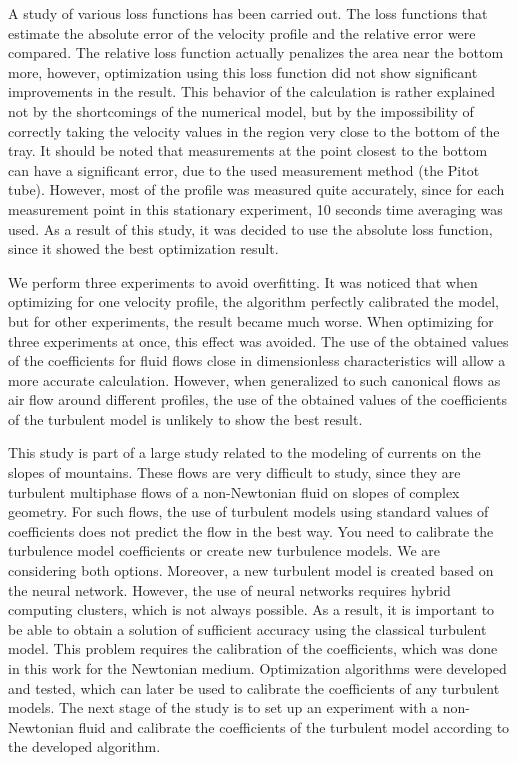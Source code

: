 \documentclass[mathematics,article,submit,pdftex,moreauthors]{Definitions/mdpi}
\begin{document}
A study of various loss functions has been carried out. The loss functions that estimate the absolute error of the velocity profile and the relative error were compared. The relative loss function actually penalizes the area near the bottom more, however, optimization using this loss function did not show significant improvements in the result. This behavior of the calculation is rather explained not by the shortcomings of the numerical model, but by the impossibility of correctly taking the velocity values in the region very close to the bottom of the tray. It should be noted that measurements at the point closest to the bottom can have a significant error, due to the used measurement method (the Pitot tube). However, most of the profile was measured quite accurately, since for each measurement point in this stationary experiment, 10 seconds time averaging was used. As a result of this study, it was decided to use the absolute loss function, since it showed the best optimization result.

We perform three experiments to avoid overfitting. It was noticed that when optimizing for one velocity profile, the algorithm perfectly calibrated the model, but for other experiments, the result became much worse. When optimizing for three experiments at once, this effect was avoided. The use of the obtained values of the coefficients for fluid flows close in dimensionless characteristics will allow a more accurate calculation. However, when generalized to such canonical flows as air flow around different profiles, the use of the obtained values of the coefficients of the turbulent model is unlikely to show the best result.

This study is part of a large study related to the modeling of currents on the slopes of mountains. These flows are very difficult to study, since they are turbulent multiphase flows of a non-Newtonian fluid on slopes of complex geometry. For such flows, the use of turbulent models using standard values of coefficients does not predict the flow in the best way. You need to calibrate the turbulence model coefficients or create new turbulence models. We are considering both options. Moreover, a new turbulent model is created based on the neural network. However, the use of neural networks requires hybrid computing clusters, which is not always possible. As a result, it is important to be able to obtain a solution of sufficient accuracy using the classical turbulent model. This problem requires the calibration of the coefficients, which was done in this work for the Newtonian medium. Optimization algorithms were developed and tested, which can later be used to calibrate the coefficients of any turbulent models. The next stage of the study is to set up an experiment with a non-Newtonian fluid and calibrate the coefficients of the turbulent model according to the developed algorithm.
\end{document}
